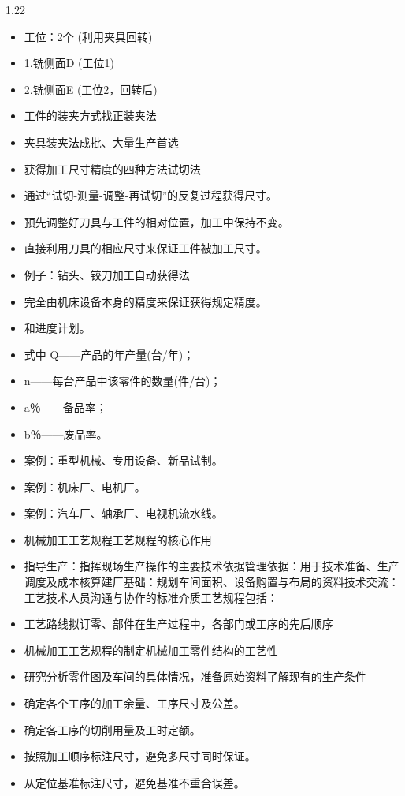 \documentclass[12pt,a4paper]{article}
\begin{document}
\begin{spacing}{1.22}
\begin{itemize}[leftmargin=2.2em,label=--]
  \item 工位：2个 (利用夹具回转)
  \item 1.铣侧面D (工位1)
  \item 2.铣侧面E (工位2，回转后)
  \item 工件的装夹方式找正装夹法
  \item 夹具装夹法成批、大量生产首选
  \item 获得加工尺寸精度的四种方法试切法
  \item 通过“试切-测量-调整-再试切”的反复过程获得尺寸。
  \item 预先调整好刀具与工件的相对位置，加工中保持不变。
  \item 直接利用刀具的相应尺寸来保证工件被加工尺寸。
  \item 例子：钻头、铰刀加工自动获得法
  \item 完全由机床设备本身的精度来保证获得规定精度。
  \item 和进度计划。
  \item 式中 Q——产品的年产量(台/年)；
  \item n——每台产品中该零件的数量(件/台)；
  \item a％——备品率；
  \item b％——废品率。
  \item 案例：重型机械、专用设备、新品试制。
  \item 案例：机床厂、电机厂。
  \item 案例：汽车厂、轴承厂、电视机流水线。
  \item 机械加工工艺规程工艺规程的核心作用
  \item 指导生产：指挥现场生产操作的主要技术依据管理依据：用于技术准备、生产调度及成本核算建厂基础：规划车间面积、设备购置与布局的资料技术交流：工艺技术人员沟通与协作的标准介质工艺规程包括：
  \item 工艺路线拟订零、部件在生产过程中，各部门或工序的先后顺序
  \item 机械加工工艺规程的制定机械加工零件结构的工艺性
  \item 研究分析零件图及车间的具体情况，准备原始资料了解现有的生产条件
  \item 确定各个工序的加工余量、工序尺寸及公差。
  \item 确定各工序的切削用量及工时定额。
  \item 按照加工顺序标注尺寸，避免多尺寸同时保证。
  \item 从定位基准标注尺寸，避免基准不重合误差。
\end{itemize}


\end{spacing}
\end{document}
